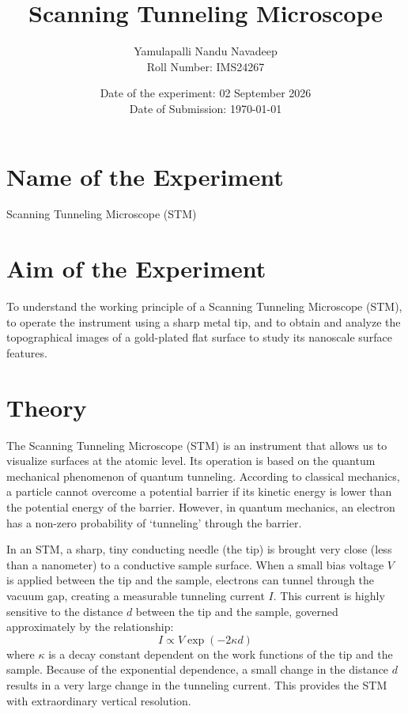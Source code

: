 \documentclass[12pt, a4paper]{article}
\title{\textbf{Scanning Tunneling Microscope}}
\author{Yamulapalli Nandu Navadeep \\ Roll Number: IMS24267}
\date{Date of the experiment: 02 September 2026 \\ Date of Submission: \today}
\begin{document}
\maketitle

\section{Name of the Experiment}
Scanning Tunneling Microscope (STM)

\section{Aim of the Experiment}
To understand the working principle of a Scanning Tunneling Microscope (STM), to operate the instrument using a sharp metal tip, and to obtain and analyze the topographical images of a gold-plated flat surface to study its nanoscale surface features.

\section{Theory}
The Scanning Tunneling Microscope (STM) is an instrument that allows us to visualize surfaces at the atomic level. Its operation is based on the quantum mechanical phenomenon of quantum tunneling. According to classical mechanics, a particle cannot overcome a potential barrier if its kinetic energy is lower than the potential energy of the barrier. However, in quantum mechanics, an electron has a non-zero probability of `tunneling' through the barrier.

In an STM, a sharp, tiny conducting needle (the tip) is brought very close (less than a nanometer) to a conductive sample surface. When a small bias voltage $V$ is applied between the tip and the sample, electrons can tunnel through the vacuum gap, creating a measurable tunneling current $I$. This current is highly sensitive to the distance $d$ between the tip and the sample, governed approximately by the relationship:
\begin{equation}
I \propto V \exp(-2 \kappa d)
\end{equation}
where $\kappa$ is a decay constant dependent on the work functions of the tip and the sample. Because of the exponential dependence, a small change in the distance $d$ results in a very large change in the tunneling current. This provides the STM with extraordinary vertical resolution.
\end{document}
